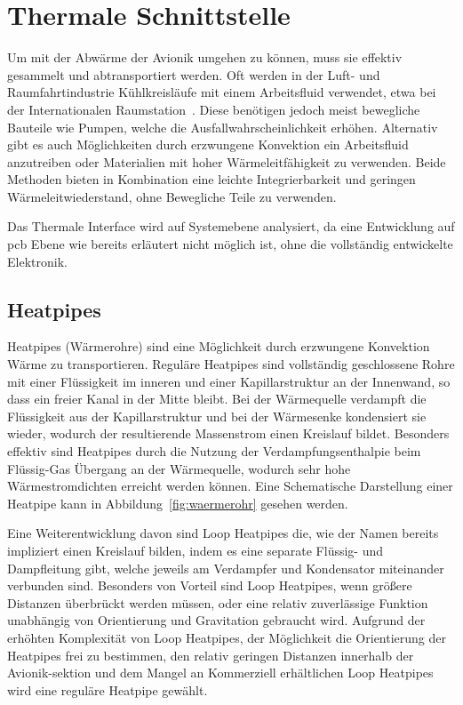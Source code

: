 \section{Thermale Schnittstelle}\label{sec:thermale_schnittstelle}

Um mit der Abwärme der Avionik umgehen zu können, muss sie effektiv gesammelt und abtransportiert werden.
Oft werden in der Luft- und Raumfahrtindustrie Kühlkreisläufe mit einem Arbeitsfluid verwendet, etwa bei der Internationalen Raumstation~\cite{ISS-ATCS}.
Diese benötigen jedoch meist bewegliche Bauteile wie Pumpen, welche die Ausfallwahrscheinlichkeit erhöhen. Alternativ gibt es auch
Möglichkeiten durch erzwungene Konvektion ein Arbeitsfluid anzutreiben oder Materialien mit hoher Wärmeleitfähigkeit
zu verwenden. Beide Methoden bieten in Kombination eine leichte Integrierbarkeit und geringen Wärmeleitwiederstand,
ohne Bewegliche Teile zu verwenden.

Das Thermale Interface wird auf Systemebene analysiert, da eine Entwicklung auf \ac{pcb} Ebene wie bereits erläutert nicht
möglich ist, ohne die vollständig entwickelte Elektronik.

\subsection{Heatpipes}\label{sec:waermerohre}

Heatpipes (Wärmerohre) sind eine Möglichkeit durch erzwungene Konvektion Wärme zu transportieren. Reguläre Heatpipes
sind vollständig geschlossene Rohre mit einer Flüssigkeit im inneren und einer Kapillarstruktur an der Innenwand,
so dass ein freier Kanal in der Mitte bleibt. Bei der Wärmequelle
verdampft die Flüssigkeit aus der Kapillarstruktur und bei der Wärmesenke kondensiert sie wieder, wodurch der resultierende Massenstrom einen
Kreislauf bildet. Besonders effektiv sind Heatpipes durch die Nutzung der Verdampfungsenthalpie beim Flüssig-Gas Übergang an der Wärmequelle,
wodurch sehr hohe Wärmestromdichten erreicht werden können. Eine Schematische Darstellung einer Heatpipe kann in Abbildung~\ref{fig:waermerohr}
gesehen werden.

Eine Weiterentwicklung davon sind Loop Heatpipes die, wie der Namen bereits impliziert einen Kreislauf bilden, indem es eine
separate Flüssig- und Dampfleitung gibt, welche jeweils am Verdampfer und Kondensator miteinander verbunden sind.
Besonders von Vorteil sind Loop Heatpipes, wenn größere Distanzen überbrückt werden müssen, oder eine relativ zuverlässige
Funktion unabhängig von Orientierung und Gravitation gebraucht wird. Aufgrund der erhöhten Komplexität von Loop Heatpipes, der Möglichkeit
die Orientierung der Heatpipes frei zu bestimmen, den relativ geringen Distanzen innerhalb der Avionik-sektion und dem Mangel an Kommerziell erhältlichen
Loop Heatpipes wird eine reguläre Heatpipe gewählt.


